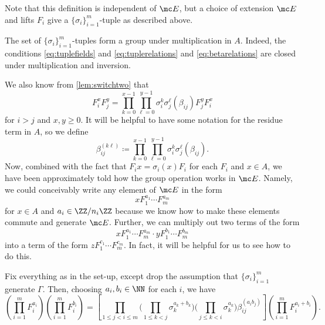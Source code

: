 \documentclass{article}
\numberwithin{equation}{section}
\begin{document}
Note that this definition is independent of $\mc E$, but a choice of extension $\mc E$ and lifts $F_i$ give a $\{\sigma_i\}_{i=1}^m$-tuple as described above.
\begin{remark}
	The set of $\{\sigma_i\}_{i=1}^m$-tuples form a group under multiplication in $A$. Indeed, the conditions \autoref{eq:tuplefields} and \autoref{eq:tuplerelations} and \autoref{eq:betarelations} are closed under multiplication and inversion.
\end{remark}
We also know from \autoref{lem:switchtwo} that
\[F_i^xF_j^y=\prod_{k=0}^{x-1}\prod_{\ell=0}^{y-1}\sigma_i^k\sigma_j^\ell(\beta_{ij})F_j^yF_i^x\]
for $i>j$ and $x,y\ge0$. It will be helpful to have some notation for the residue term in $A$, so we define
\[\beta_{ij}^{(k\ell)}\coloneqq\prod_{k=0}^{x-1}\prod_{\ell=0}^{y-1}\sigma_i^k\sigma_j^\ell(\beta_{ij}).\]
Now, combined with the fact that $F_ix=\sigma_i(x)F_i$ for each $F_i$ and $x\in A$, we have been approximately told how the group operation works in $\mc E$. Namely, we could conceivably write any element of $\mc E$ in the form
\[xF_1^{a_1}\cdots F_m^{a_m}\]
for $x\in A$ and $a_i\in\ZZ/n_i\ZZ$ because we know how to make these elements commute and generate $\mc E$. Further, we can multiply out two terms of the form
\[xF_1^{a_1}\cdots F_m^{a_m}\cdot yF_1^{b_1}\cdots F_m^{b_m}\]
into a term of the form $zF_1^{c_1}\cdots F_m^{c_m}$. In fact, it will be helpful for us to see how to do this.
\begin{proposition} \label{prop:multiplytwoelements}
	Fix everything as in the set-up, except drop the assumption that $\{\sigma_i\}_{i=1}^m$ generate $\Gamma$. Then, choosing $a_i,b_i\in\NN$ for each $i$, we have
	\[\left(\prod_{i=1}^mF_i^{a_i}\right)\left(\prod_{i=1}^mF_i^{b_i}\right)=\left[\prod_{1\le j<i\le m}\Bigg(\prod_{1\le k<j}\sigma_k^{a_k+b_k}\Bigg)\Bigg(\prod_{j\le k<i}\sigma_k^{a_k}\Bigg)\beta_{ij}^{(a_ib_j)}\right]\left(\prod_{i=1}^mF_i^{a_i+b_i}\right).\]
\end{proposition}
\end{document}
